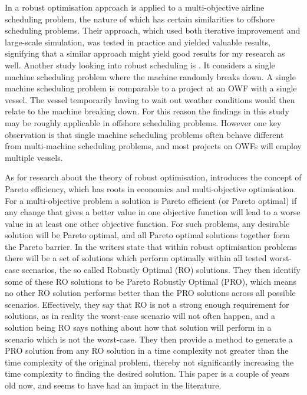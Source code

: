 \documentclass[a4paper,12pt]{article}
\begin{document}
In \cite{burke2010multi} a robust optimisation approach is applied to a multi-objective airline scheduling problem, the nature of which has certain similarities to offshore scheduling problems. Their approach, which used both iterative improvement and large-scale simulation, was tested in practice and yielded valuable results, signifying that a similar approach might yield good results for my research as well. 
Another study looking into robust scheduling is \cite{goren2008robustness}. It considers a single machine scheduling problem where the machine randomly breaks down. A single machine scheduling problem is comparable to a project at an OWF with a single vessel. The vessel temporarily having to wait out weather conditions would then relate to the machine breaking down. For this reason the findings in this study may be roughly applicable in offshore scheduling problems. However one key observation is that single machine scheduling problems often behave different from multi-machine scheduling problems, and most projects on OWFs will employ multiple vessels. 

As for research about the theory of robust optimisation, \cite{iancu2013pareto} introduces the concept of Pareto efficiency, which has roots in economics and multi-objective optimisation. For a multi-objective problem a solution is Pareto efficient (or Pareto optimal) if any change that gives a better value in one objective function will lead to a worse value in at least one other objective function. For such problems, any desirable solution will be Pareto optimal, and all Pareto optimal solutions together form the Pareto barrier. In \cite{iancu2013pareto} the writers state that within robust optimisation problems there will be a set of solutions which perform optimally within all tested worst-case scenarios, the so called Robustly Optimal (RO) solutions. They then identify some of these RO solutions to be Pareto Robustly Optimal (PRO), which means no other RO solution performs better than the PRO solutions across all possible scenarios. Effectively, they say that RO is not a strong enough requirement for solutions, as in reality the worst-case scenario will not often happen, and a solution being RO says nothing about how that solution will perform in a scenario which is not the worst-case. They then provide a method to generate a PRO solution from any RO solution in a time complexity not greater than the time complexity of the original problem, thereby not significantly increasing the time complexity to finding the desired solution. This paper is a couple of years old now, and seems to have had an impact in the literature.
\end{document}
